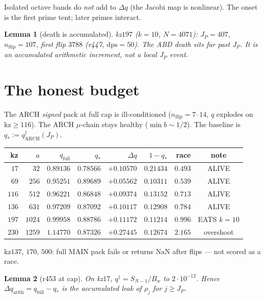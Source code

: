 \documentclass[11pt]{article}
\newtheorem{lemma}{Lemma}
\begin{document}
Isolated octave bands do \emph{not}
add to $\Delta q$ (the Jacobi map is
nonlinear).  The onset is the first
prime tent; later primes interact.

\begin{lemma}[death is accumulated]\label{lem:death}
kz$197$ ($k=10$, $N=4071$):
$J_P=407$, $n_{\mathrm{flip}}=107$,
first flip $3788$ (r447, $\mathrm{dps}=50$).
The ABD death sits far past $J_P$.
It is an accumulated arithmetic
increment, not a local $J_P$ event.
\end{lemma}

\section{The honest budget}\label{sec:B}

The ARCH \emph{signed} pack at full cap
is ill-conditioned ($n_{\mathrm{flip}}=7$--$14$,
$q$ explodes on kz$\ge 116$).
The ARCH $\mu$-chain stays healthy
($\min b\sim 1/2$).
The baseline is
$q_*:=q^{\dagger}_{\mathrm{ARCH}}(J_P)$.

\begin{center}
\small
\begin{tabular}{@{}rrrrrrrc@{}}
\toprule
kz & $a$ & $q_{\mathrm{full}}$ & $q_*$ &
 $\Delta q$ & $1-q_*$ & race & note \\
\midrule
$17$  & $32$   & $0.89136$ & $0.78566$ &
 $+0.10570$ & $0.21434$ & $0.493$ & ALIVE \\
$69$  & $256$  & $0.95251$ & $0.89689$ &
 $+0.05562$ & $0.10311$ & $0.539$ & ALIVE \\
$116$ & $512$  & $0.96221$ & $0.86848$ &
 $+0.09374$ & $0.13152$ & $0.713$ & ALIVE \\
$136$ & $631$  & $0.97209$ & $0.87092$ &
 $+0.10117$ & $0.12908$ & $0.784$ & ALIVE \\
$197$ & $1024$ & $0.99958$ & $0.88786$ &
 $+0.11172$ & $0.11214$ & $0.996$ & EATS $k=10$ \\
$230$ & $1259$ & $1.14770$ & $0.87326$ &
 $+0.27445$ & $0.12674$ & $2.165$ & overshoot \\
\bottomrule
\end{tabular}
\end{center}

kz$137$, $170$, $500$: full MAIN pack
fails or returns $\mathrm{NaN}$ after
flips --- not scored as a race.

\begin{lemma}[r453 at cap]\label{lem:id}
On kz$17$,
$q^{\dagger}=S_{N-1}/B_w$ to $2\cdot10^{-12}$.
Hence
$\Delta q_{\mathrm{arith}}=q_{\mathrm{full}}-q_*$
is the accumulated leak of $\rho_j$ for
$j\ge J_P$.
\end{lemma}
\end{document}
